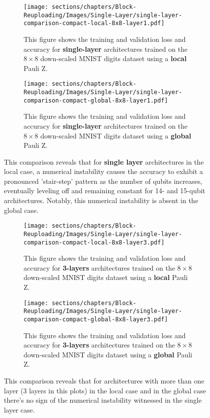 \begin{figure}[H]
    \centering
    \begin{subfigure}[b]{\textwidth}
        \texttt{[image: sections/chapters/Block-Reuploading/Images/Single-Layer/single-layer-comparison-compact-local-8x8-layer1.pdf]}
    \caption{This figure shows the training and validation loss and accuracy for \textbf{single-layer} architectures
    trained on the $8\times8$ down-scaled MNIST digits dataset using a \textbf{local} Pauli Z.}
    \end{subfigure}
    \begin{subfigure}[b]{\textwidth}
        \texttt{[image: sections/chapters/Block-Reuploading/Images/Single-Layer/single-layer-comparison-compact-global-8x8-layer1.pdf]}
    \caption{This figure shows the training and validation loss and accuracy for \textbf{single-layer} architectures
    trained on the $8\times8$ down-scaled MNIST digits dataset using a \textbf{global} Pauli Z.}
    \end{subfigure}
    \caption{This comparison reveals that for \textbf{single layer} architectures in the local case, a numerical instability causes the accuracy 
    to exhibit a pronounced 'stair-step' pattern as the number of qubits increases, eventually 
    leveling off and remaining constant for 14- and 15-qubit architectures. Notably, this numerical 
    instability is absent in the global case.}
    \label{fig:single}
\end{figure}


\begin{figure}[H]
    \centering
    \begin{subfigure}[b]{\textwidth}
        \texttt{[image: sections/chapters/Block-Reuploading/Images/Single-Layer/single-layer-comparison-compact-local-8x8-layer3.pdf]}
    \caption{This figure shows the training and validation loss and accuracy for \textbf{3-layers} architectures
    trained on the $8\times8$ down-scaled MNIST digits dataset using a \textbf{local} Pauli Z.}
    \end{subfigure}
    \begin{subfigure}[b]{\textwidth}
        \texttt{[image: sections/chapters/Block-Reuploading/Images/Single-Layer/single-layer-comparison-compact-global-8x8-layer3.pdf]}
    \caption{This figure shows the training and validation loss and accuracy for \textbf{3-layers} architectures
    trained on the $8\times8$ down-scaled MNIST digits dataset using a \textbf{global} Pauli Z.}
    \end{subfigure}
    \caption{This comparison reveals that for architectures with more than one layer (3 layers in this plots) 
    in the local case and in the global case there's no sign of the numerical instability witnessed in the single layer
    case.}
    \label{fig:three-layers}
\end{figure}

